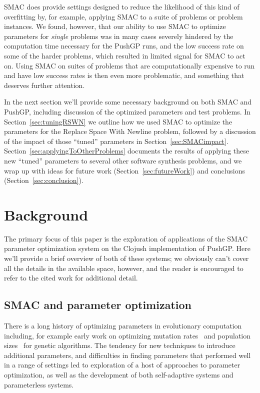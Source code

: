 SMAC does provide settings designed to reduce the likelihood of this kind of
overfitting by, for example, applying SMAC to a suite of problems or problem
instances. We found, however, that
our ability to use SMAC to optimize parameters for \emph{single} problems
was in many cases severely
hindered by the computation time necessary for the PushGP runs, and the low
success rate on some of the harder problems, which resulted in limited
signal for SMAC to act on. Using SMAC on suites of problems that are
computationally expensive to run and have low success rates is then even
more problematic, and something that deserves further attention.

In the next section we'll provide some necessary background on both SMAC
and PushGP, including discussion of the optimized parameters and test
problems. In Section~\ref{sec:tuningRSWN} we outline how we 
used SMAC to optimize the parameters for the Replace Space With Newline
problem, followed by a discussion of the impact of those ``tuned''
parameters in Section~\ref{sec:SMACimpact}. 
Section~\ref{sec:applyingToOtherProblems} documents the results of
applying these new ``tuned'' parameters to several other software
synthesis problems, and we wrap up with ideas for future work
(Section~\ref{sec:futureWork}) and conclusions (Section~\ref{sec:conclusion}).

\section{Background}
\label{sec:background}

The primary focus of this paper is the exploration of applications of the SMAC
parameter optimization system on the Clojush implementation of
PushGP. Here we'll provide a brief overview of both of these systems; we
obviously can't cover all the details in the available space, however, and the
reader is encouraged to refer to the cited work for additional detail.

\subsection{SMAC and parameter optimization}
\label{sec:SMACbackground}

There is a long history of optimizing parameters in evolutionary computation
including, for example early work on optimizing mutation rates~\cite{back1993optimal} and 
population sizes~\cite{alander1992optimal} for genetic algorithms.
The tendency for new techniques to introduce additional parameters, 
and difficulties in finding parameters that performed well in a range of
settings led to exploration of a host of approaches to parameter
optimization, as well as the development of both self-adaptive systems
and parameterless systems.~\cite{lobo2007parameter}

